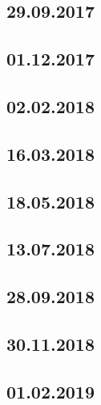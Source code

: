 \documentclass[a4paper,12p]{article}
\begin{document}
	\newpage
	\subsection{29.09.2017}
	
	
	
	
	
	\newpage
	\subsection{01.12.2017}
	
	
	
	
	
	\subsection{02.02.2018}
	
	
	
	
	
	\newpage
	\subsection{16.03.2018}
	
	
	
	
	
	\newpage
	\subsection{18.05.2018}
	
	
	
	
	
	\subsection{13.07.2018}
	
	
	
	
	
	\subsection{28.09.2018}
	\subsection{30.11.2018}
	\subsection{01.02.2019}
	
\end{document}
